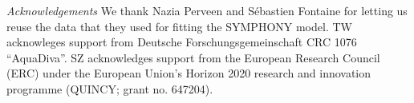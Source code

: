 \documentclass[authoryear,preprint,review,12pt]{elsarticle}
\newenvironment{acknowledgements}
{\textit{Acknowledgements} }
{}
\begin{document}
\linenumbers


\begin{abstract}

\end{abstract}




\appendix

%






\begin{acknowledgements}
We thank Nazia Perveen and S\'{e}bastien Fontaine for letting us reuse the data
that they used for fitting the SYMPHONY model. TW acknowleges support from Deutsche Forschungsgemeinschaft CRC 1076
``AquaDiva''. SZ acknowledges support from the European Research Council (ERC)
under the European Union's Horizon 2020 research and innovation programme
(QUINCY; grant no. 647204).
\end{acknowledgements} 


 
 


\end{document}
